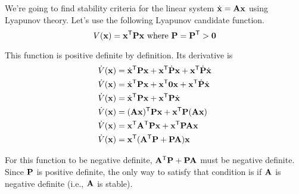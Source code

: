 We're going to find stability criteria for the linear system
$\dot{\mathbf{x}} = \mathbf{A}\mathbf{x}$ using Lyapunov theory. Let's use the following
Lyapunov candidate function.
\begin{equation*}
  V(\mathbf{x}) = \mathbf{x}^\mathsf{T}\mathbf{P}\mathbf{x} \text{ where }
    \mathbf{P} = \mathbf{P}^\mathsf{T} > \mathbf{0}
\end{equation*}

This function is positive definite by definition. Its derivative is
\begin{align*}
  \dot{V}(\mathbf{x}) &= \dot{\mathbf{x}}^\mathsf{T}\mathbf{P}\mathbf{x} +
    \mathbf{x}^\mathsf{T}\dot{\mathbf{P}}\mathbf{x} + \mathbf{x}^\mathsf{T}\dot{\mathbf{P}}\dot{\mathbf{x}} \\
  \dot{V}(\mathbf{x}) &= \dot{\mathbf{x}}^\mathsf{T}\mathbf{P}\mathbf{x} +
    \mathbf{x}^\mathsf{T}\mathbf{0}\mathbf{x} + \mathbf{x}^\mathsf{T}\dot{\mathbf{P}}\dot{\mathbf{x}} \\
  \dot{V}(\mathbf{x}) &= \dot{\mathbf{x}}^\mathsf{T}\mathbf{P}\mathbf{x} +
    \mathbf{x}^\mathsf{T}\mathbf{P}\dot{\mathbf{x}} \\
  \dot{V}(\mathbf{x}) &= (\mathbf{A}\mathbf{x})^\mathsf{T}\mathbf{P}\mathbf{x} +
    \mathbf{x}^\mathsf{T}\mathbf{P}(\mathbf{A}\mathbf{x}) \\
  \dot{V}(\mathbf{x}) &= \mathbf{x}^\mathsf{T}\mathbf{A}^\mathsf{T}\mathbf{P}\mathbf{x} +
    \mathbf{x}^\mathsf{T}\mathbf{P}\mathbf{A}\mathbf{x} \\
  \dot{V}(\mathbf{x}) &= \mathbf{x}^\mathsf{T}(\mathbf{A}^\mathsf{T}\mathbf{P} + \mathbf{P}\mathbf{A})\mathbf{x}
\end{align*}

For this function to be negative definite, $\mathbf{A}^\mathsf{T}\mathbf{P} + \mathbf{P}\mathbf{A}$
must be negative definite. Since $\mathbf{P}$ is positive definite, the only way to
satisfy that condition is if $\mathbf{A}$ is negative definite (i.e., $\mathbf{A}$ is
stable).
